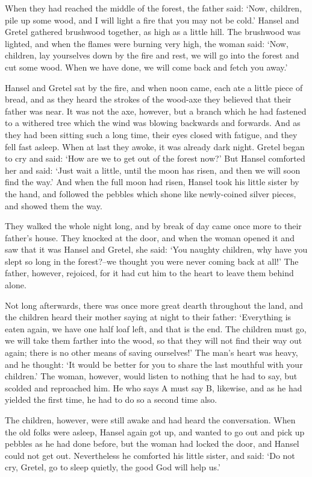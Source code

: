 \documentclass[oneside,11pt]{book} %
\begin{document}
When they had reached the middle of the forest, the father said: `Now, children, pile up some wood, and I will light a fire that you may not be cold.' Hansel and Gretel gathered brushwood together, as high as a little hill. The brushwood was lighted, and when the flames were burning very high, the woman said: `Now, children, lay yourselves down by the fire and rest, we will go into the forest and cut some wood. When we have done, we will come back and fetch you away.'

Hansel and Gretel sat by the fire, and when noon came, each ate a little piece of bread, and as they heard the strokes of the wood-axe they believed that their father was near. It was not the axe, however, but a branch which he had fastened to a withered tree which the wind was blowing backwards and forwards. And as they had been sitting such a long time, their eyes closed with fatigue, and they fell fast asleep. When at last they awoke, it was already dark night. Gretel began to cry and said: `How are we to get out of the forest now?' But Hansel comforted her and said: `Just wait a little, until the moon has risen, and then we will soon find the way.' And when the full moon had risen, Hansel took his little sister by the hand, and followed the pebbles which shone like newly-coined silver pieces, and showed them the way.

They walked the whole night long, and by break of day came once more to their father's house. They knocked at the door, and when the woman opened it and saw that it was Hansel and Gretel, she said: `You naughty children, why have you slept so long in the forest?--we thought you were never coming back at all!' The father, however, rejoiced, for it had cut him to the heart to leave them behind alone.

Not long afterwards, there was once more great dearth throughout the land, and the children heard their mother saying at night to their father: `Everything is eaten again, we have one half loaf left, and that is the end. The children must go, we will take them farther into the wood, so that they will not find their way out again; there is no other means of saving ourselves!' The man's heart was heavy, and he thought: `It would be better for you to share the last mouthful with your children.' The woman, however, would listen to nothing that he had to say, but scolded and reproached him. He who says A must say B, likewise, and as he had yielded the first time, he had to do so a second time also.

The children, however, were still awake and had heard the conversation. When the old folks were asleep, Hansel again got up, and wanted to go out and pick up pebbles as he had done before, but the woman had locked the door, and Hansel could not get out. Nevertheless he comforted his little sister, and said: `Do not cry, Gretel, go to sleep quietly, the good God will help us.'
\end{document}
